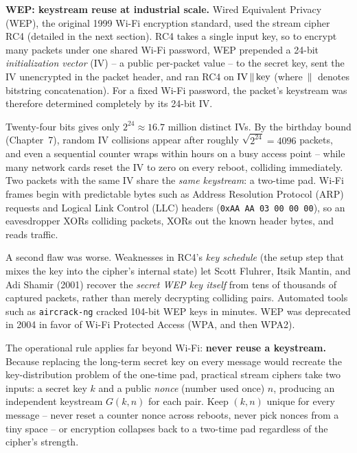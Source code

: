 \begin{attackbox}
\label{ch10:attack-wep}
\textbf{WEP: keystream reuse at industrial scale.} Wired Equivalent Privacy (WEP), the original 1999 Wi-Fi encryption standard, used the stream cipher RC4 (detailed in the next section). RC4 takes a single input key, so to encrypt many packets under one shared Wi-Fi password, WEP prepended a 24-bit \emph{initialization vector} (IV) -- a public per-packet value -- to the secret key, sent the IV unencrypted in the packet header, and ran RC4 on $\text{IV} \,\|\, \text{key}$ (where $\,\|\,$ denotes bitstring concatenation). For a fixed Wi-Fi password, the packet's keystream was therefore determined completely by its 24-bit IV.

Twenty-four bits gives only $2^{24} \approx 16.7\text{ million}$ distinct IVs. By the birthday bound (Chapter~7), random IV collisions appear after roughly $\sqrt{2^{24}} = 4096$ packets, and even a sequential counter wraps within hours on a busy access point -- while many network cards reset the IV to zero on every reboot, colliding immediately. Two packets with the same IV share the \emph{same keystream}: a two-time pad. Wi-Fi frames begin with predictable bytes such as Address Resolution Protocol (ARP) requests and Logical Link Control (LLC) headers (\texttt{0xAA AA 03 00 00 00}), so an eavesdropper XORs colliding packets, XORs out the known header bytes, and reads traffic.

A second flaw was worse. Weaknesses in RC4's \emph{key schedule} (the setup step that mixes the key into the cipher's internal state) let Scott Fluhrer, Itsik Mantin, and Adi Shamir (2001) recover the \emph{secret WEP key itself} from tens of thousands of captured packets, rather than merely decrypting colliding pairs. Automated tools such as \texttt{aircrack-ng} cracked 104-bit WEP keys in minutes. WEP was deprecated in 2004 in favor of Wi-Fi Protected Access (WPA, and then WPA2).
\end{attackbox}

\begin{focusbox}
The operational rule applies far beyond Wi-Fi: \textbf{never reuse a keystream.} Because replacing the long-term secret key on every message would recreate the key-distribution problem of the one-time pad, practical stream ciphers take two inputs: a secret key $k$ and a public \emph{nonce} (number used once) $n$, producing an independent keystream $G(k, n)$ for each pair. Keep $(k, n)$ unique for every message -- never reset a counter nonce across reboots, never pick nonces from a tiny space -- or encryption collapses back to a two-time pad regardless of the cipher's strength.
\end{focusbox}

